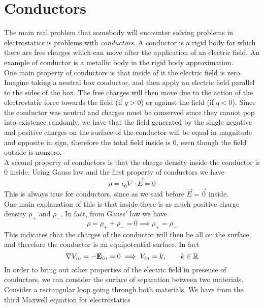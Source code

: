 \documentclass[../electromagnetism]{subfiles}
\begin{document}
\section{Conductors}
The main real problem that somebody will encounter solving problems in electrostatics is problems with \textit{conductors}. A conductor is a rigid body for which there are free charges which can move after the application of an electric field. An example of conductor is a metallic body in the rigid body approximation.\\
One main property of conductors is that inside of it the electric field is zero.\\
Imagine taking a neutral box conductor, and then apply an electric field parallel to the sides of the box. The free charges will then move due to the action of the electrostatic force towards the field (if $q>0$) or against the field (if $q<0$). Since the conductor was neutral and charges must be conserved since they cannot pop into existence randomly, we have that the field generated by the single negative and positive charges on the surface of the conductor will be equal in magnitude and opposite in sign, therefore the total field inside is 0, even though the field outside is nonzero.\\
A second property of conductors is that the charge density inside the conductor is 0 inside. Using Gauss law and the first property of conductors we have
\begin{equation}
	\rho=\epsilon_0\nabla\cdot\vec{E}=0
	\label{eq:glinsidecond}
\end{equation}
This is always true for conductors, since as we said before $\vec{E}=\vec{0}$ inside.\\
One main explanation of this is that inside there is as much positive charge density $\rho_+$ and $\rho_-$. In fact, from Gauss' law we have
\begin{equation*}
	\rho=\rho_++\rho_-=0\implies\rho_+=\rho_-
\end{equation*}
This indicates that the charges of the conductor will then be all on the surface, and therefore the conductor is an equipotential surface. In fact
\begin{equation}
	\nabla V_{in}=-\mathbf{E}_{in}=0\implies V_{in}=k,\qquad k\in\operatorname{\mathbb{R}}
	\label{eq:equipotentialconductor}
\end{equation}
In order to bring out other properties of the electric field in presence of conductors, we can consider the surface of separation between two materials. Consider a rectangular loop going through both materials. We have from the third Maxwell equation for electrostatics
\end{document}
